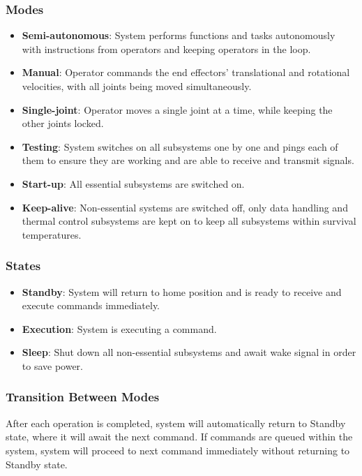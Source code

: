 \subsubsection{Modes}
\begin{itemize}[label={},leftmargin=0pt]
\item\textbf{Semi-autonomous}: System performs functions and tasks autonomously with instructions from operators and keeping operators in the loop.
\item\textbf{Manual}: Operator commands the end effectors' translational and rotational velocities, with all joints being moved simultaneously.
\item\textbf{Single-joint}: Operator moves a single joint at a time, while keeping the other joints locked.
\item\textbf{Testing}: System switches on all subsystems one by one and pings each of them to ensure they are working and are able to receive and transmit signals.
\item\textbf{Start-up}: All essential subsystems are switched on.	
\item\textbf{Keep-alive}: Non-essential systems are switched off, only data handling and thermal control subsystems are kept on to keep all subsystems within survival temperatures.
\end{itemize}

\subsubsection{States}
\begin{itemize}[label={},leftmargin=0pt]
\item\textbf{Standby}: System will return to home position and is ready to receive and execute commands immediately. 
\item\textbf{Execution}: System is executing a command.
\item\textbf{Sleep}: Shut down all non-essential subsystems and await wake signal in order to save power.
\end{itemize}

\subsubsection{Transition Between Modes}
After each operation is completed, system will automatically return to Standby state, where it will await the next command. If commands are queued within the system, system will proceed to next command immediately without returning to Standby state.